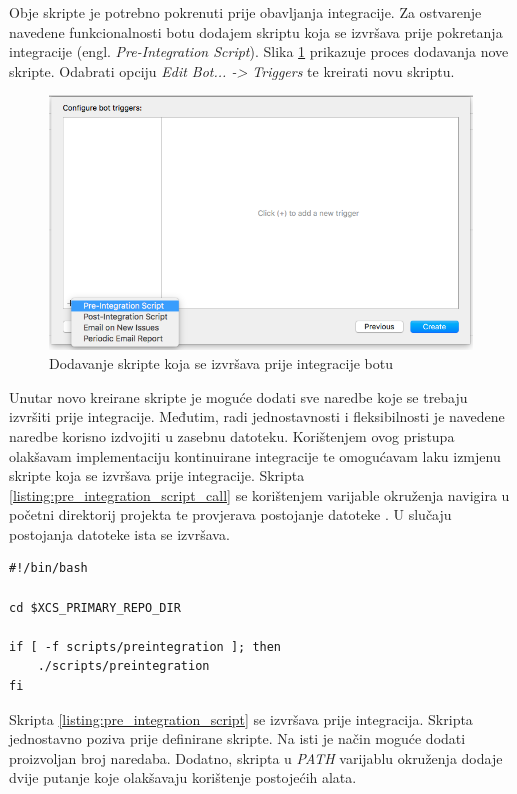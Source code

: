 \documentclass[times, utf8, diplomski, numeric]{fer}
\newcommand{\eng}[1]{(engl. \textit{#1})}
\begin{document}
\begin{appendices}
Obje skripte je potrebno pokrenuti prije obavljanja integracije. Za ostvarenje navedene funkcionalnosti botu dodajem skriptu koja se izvršava prije pokretanja integracije \eng{Pre-Integration Script}. Slika \ref{fig:PreIntegrationScript} prikazuje proces dodavanja nove skripte. Odabrati opciju \textit{Edit Bot... -> Triggers} te kreirati novu skriptu.

\begin{figure}
\centering
\includegraphics[scale=0.5]{PreIntegrationScript}
\caption{Dodavanje skripte koja se izvršava prije integracije botu}
\label{fig:PreIntegrationScript}
\end{figure}

Unutar novo kreirane skripte je moguće dodati sve naredbe koje se trebaju izvršiti prije integracije. Međutim, radi jednostavnosti i fleksibilnosti je navedene naredbe korisno izdvojiti u zasebnu datoteku. Korištenjem ovog pristupa olakšavam implementaciju kontinuirane integracije te omogućavam laku izmjenu skripte koja se izvršava prije integracije. Skripta \ref{listing:pre_integration_script_call} se korištenjem  varijable okruženja navigira u početni direktorij projekta te provjerava postojanje datoteke . U slučaju postojanja datoteke ista se izvršava.

\begin{lstlisting}[caption=Poziv skripte koja se izvršava prije integracije, label=listing:pre_integration_script_call]
#!/bin/bash

cd $XCS_PRIMARY_REPO_DIR

if [ -f scripts/preintegration ]; then
    ./scripts/preintegration
fi
\end{lstlisting}

Skripta \ref{listing:pre_integration_script} se izvršava prije integracija. Skripta jednostavno poziva prije definirane skripte. Na isti je način moguće dodati proizvoljan broj naredaba. Dodatno, skripta u \textit{PATH} varijablu okruženja dodaje dvije putanje koje olakšavaju korištenje postojećih alata.


\end{appendices}
\end{document}
